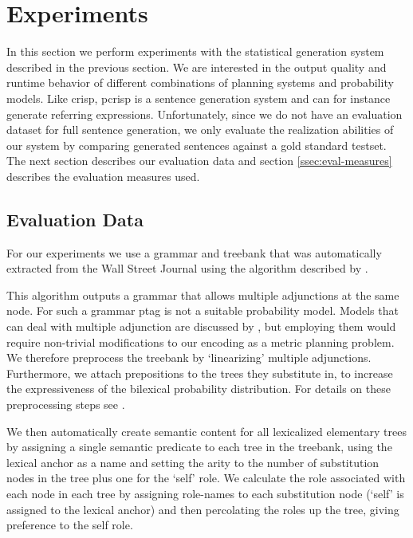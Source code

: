 \section{Experiments}
\label{sec:experiments}
In this section we perform experiments with the statistical generation system described in the previous section.  We are interested in the output quality and runtime behavior of different combinations of planning systems and probability models. Like {\sc crisp}, {\sc pcrisp} is a sentence generation system and can for instance generate referring expressions. Unfortunately, since we do not have an evaluation dataset for full sentence generation, we only evaluate the realization abilities of our system by comparing generated sentences against a gold standard testset. The next section describes our evaluation data and section \ref{ssec:eval-measures} describes the evaluation measures used. 

\subsection{Evaluation Data}
For our experiments we use a grammar and treebank that was automatically extracted from the Wall Street Journal using the algorithm described by .   

This algorithm outputs a grammar that allows multiple adjunctions at the same node. For such a grammar {\sc ptag} is not a suitable probability model. Models that can deal with multiple adjunction are discussed by , but employing them would require non-trivial modifications to our encoding as a metric planning problem. We therefore preprocess the treebank by `linearizing' multiple adjunctions. Furthermore, we attach prepositions to the trees they substitute in, to increase the expressiveness of the bilexical probability distribution. For details on these preprocessing steps see \cite{bauer2009}.

We then automatically create semantic content for all lexicalized elementary trees by assigning a single semantic predicate to each tree in the treebank, using the lexical anchor as a name and setting the arity to the number of substitution nodes in the tree plus one for the `self' role.  We calculate the role associated with each node in each tree by assigning role-names to each substitution node (`self' is assigned to the lexical anchor) and then percolating the roles up the tree, giving preference to the self role.  

